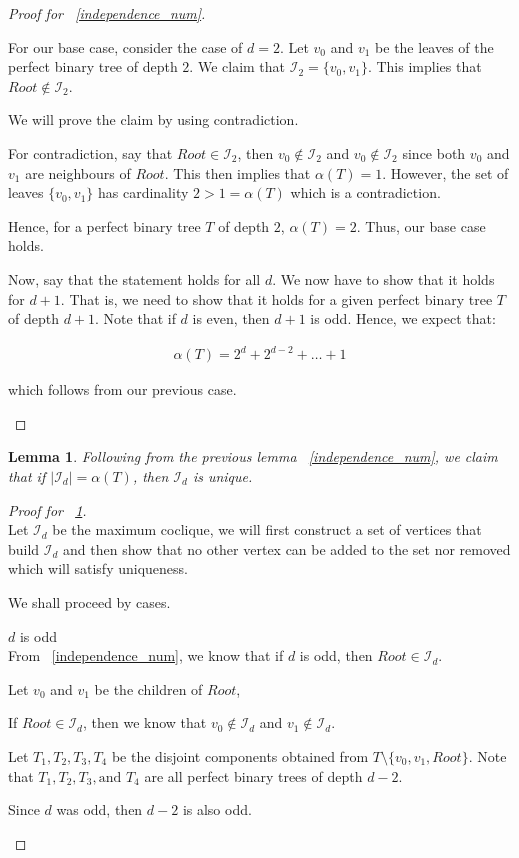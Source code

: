 \documentclass{amsart}
\newtheorem{lemma}[theorem]{Lemma}
\theoremstyle{definition}
\begin{document}
\begin{proof}[Proof for ~\ref{independence_num}]
\begin{caseof}
		For our base case, consider the case of $d = 2$. Let $v_0$ and $v_1$ be the leaves of the perfect binary tree of depth $2$. We claim that $\mathcal{I}_2 = \{v_0, v_1\}$. This implies that $Root \not\in \mathcal{I}_2$. 

		We will prove the claim by using contradiction.	

		For contradiction, say that $Root \in \mathcal{I}_2$, then $v_0 \not\in \mathcal{I}_2$ and $v_0 \not\in \mathcal{I}_2$ since both $v_0$ and $v_1$ are neighbours of $Root$. This then implies that $\alpha(T) = 1$. However, the set of leaves $\{v_0, v_1\}$ has cardinality $2 > 1 = \alpha(T)$ which is a contradiction.

		Hence, for a perfect binary tree $T$ of depth $2$, $\alpha(T) = 2$. Thus, our base case holds.


		Now, say that the statement holds for all $d$. We now have to show that it holds for $d+1$. That is, we need to show that it holds for a given perfect binary tree $T$ of depth $d + 1$. Note that if $d$ is even, then $d + 1$ is odd. Hence, we expect that:

		\begin{align*}
			\alpha(T) = 2^d + 2^{d - 2} + \ldots + 1
		\end{align*}

		which follows from our previous case.
	\end{caseof}
\end{proof}

\begin{lemma}\label{unique_independence_num}
Following from the previous lemma ~\ref{independence_num}, we claim that if $|\mathcal{I}_d| = \alpha(T)$, then $\mathcal{I}_d$ is unique.
\end{lemma}
\begin{proof}[Proof for ~\ref{unique_independence_num}]
	$ $ \\
	Let $\mathcal{I}_d$ be the maximum coclique, we will first construct a set of vertices that build $\mathcal{I}_d$ and then show that no other vertex can be added to the set nor removed which will satisfy uniqueness.

	We shall proceed by cases.
	\begin{caseof}
	\item $d$ is odd \\
		From ~\ref{independence_num}, we know that if $d$ is odd, then $Root \in \mathcal{I}_d$. 

		Let $v_0$ and $v_1$ be the children of $Root$, 

		If $Root \in \mathcal{I}_d$, then we know that $v_0 \not\in \mathcal{I}_d$ and $v_1 \not\in \mathcal{I}_d$.

		Let $T_1, T_2, T_3, T_4$ be the disjoint components obtained from $T\setminus\{v_0, v_1, Root\}$. Note that $T_1, T_2, T_3, \text{and } T_4$ are all perfect binary trees of depth $d - 2$.

		Since $d$ was odd, then $d - 2$ is also odd.
	\end{caseof}
\end{proof}
\end{document}
